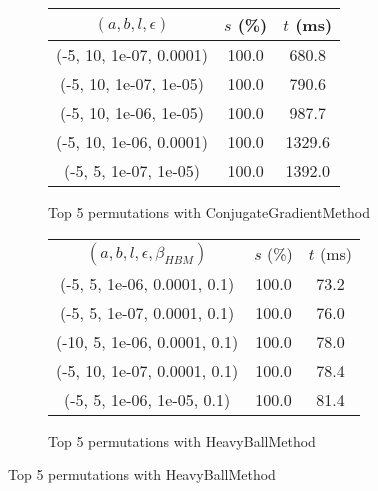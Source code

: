 \begin{figure}[H]
\begin{subfigure}[ht]{.5\textwidth}
\begin{tabular}{|c|c|c|}
\hline
\rowcolor{gray!25}
$(a,b,l,\epsilon)$ & $s$ (\%) & $t$ (ms) \\
\hline
(-5, 10, 1e-07, 0.0001) & 100.0 & 680.8 \\
(-5, 10, 1e-07, 1e-05) & 100.0 & 790.6 \\
(-5, 10, 1e-06, 1e-05) & 100.0 & 987.7 \\
(-5, 10, 1e-06, 0.0001) & 100.0 & 1329.6 \\
(-5, 5, 1e-07, 1e-05) & 100.0 & 1392.0 \\
\hline
\end{tabular}
\caption{Top 5 permutations with ConjugateGradientMethod}
\label{subfig:param_comp_NegativeEntropy_ConjugateGradientMethod_DichotomousSearch}
\end{subfigure}
\hfill
\begin{subfigure}[ht]{.5\textwidth}
\begin{tabular}{|c|c|c|}
\hline
\rowcolor{gray!25}
\multicolumn{3}{|c|}{HeavyBallMethod} \\
\hline
\rowcolor{gray!25}
$(a,b,l,\epsilon,\beta_{HBM})$ & $s$ (\%) & $t$ (ms) \\
\hline
(-5, 5, 1e-06, 0.0001, 0.1) & 100.0 & 73.2 \\
(-5, 5, 1e-07, 0.0001, 0.1) & 100.0 & 76.0 \\
(-10, 5, 1e-06, 0.0001, 0.1) & 100.0 & 78.0 \\
(-5, 10, 1e-07, 0.0001, 0.1) & 100.0 & 78.4 \\
(-5, 5, 1e-06, 1e-05, 0.1) & 100.0 & 81.4 \\
\hline
\end{tabular}
\caption{Top 5 permutations with HeavyBallMethod}
\label{subfig:param_comp_NegativeEntropy_HeavyBallMethod_DichotomousSearch}
\end{subfigure}
\end{figure}